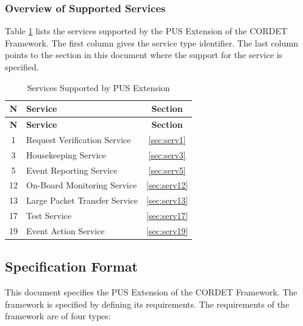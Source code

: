 \documentclass[a4paper,10pt]{article}
\begin{document}
\subsubsection{Overview of Supported Services}
Table \ref{tab:supportedServ} lists the services supported by the PUS Extension of the CORDET Framework. The first column gives the service type identifier. The last column points to the section in this document where the support for the service is specified.

\begin{longtable}{|c|>{\raggedright\arraybackslash}p{6cm}|c|}
\caption{Services Supported by PUS Extension}\label{tab:supportedServ} \\
\hline
\rowcolor{light-gray}
\textbf{N} &\textbf{Service} & \textbf{Section} \\
\hline\hline
\endfirsthead
\rowcolor{light-gray}
\textbf{N} &\textbf{Service} & \textbf{Section} \\
\hline\hline
\endhead
1 & Request Verification Service & \ref{sec:serv1} \\
\hline
3 & Housekeeping Service & \ref{sec:serv3} \\
\hline
5 & Event Reporting Service & \ref{sec:serv5} \\
\hline
12 & On-Board Monitoring Service & \ref{sec:serv12} \\
\hline
13 & Large Packet Transfer Service & \ref{sec:serv13} \\
\hline
17 & Test Service & \ref{sec:serv17} \\
\hline
19 & Event Action Service & \ref{sec:serv19} \\
\hline
\end{longtable} 


\subsection{Specification Format} 
This document specifies the PUS Extension of the CORDET Framework. The framework is specified by defining its requirements. The requirements of the framework are of four types:
\end{document}
